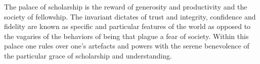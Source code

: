 

The palace of scholarship is the reward of generosity and productivity
and the society of fellowship.  The invariant dictates of trust and
integrity, confidence and fidelity are known as specific and
particular features of the world as opposed to the vagaries of the
behaviors of being that plague a fear of society.  Within this palace
one rules over one's artefacts and powers with the serene benevolence
of the particular grace of scholarship and understanding.

\bye
